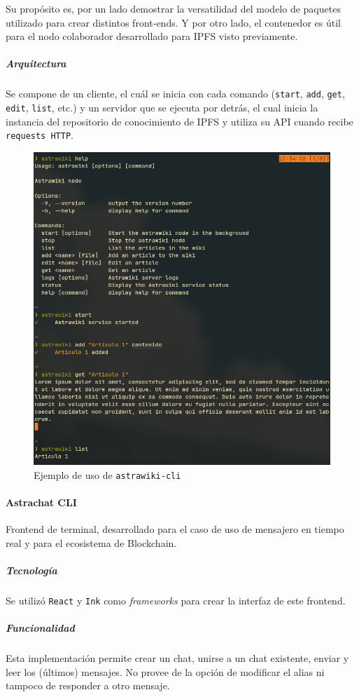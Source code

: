 Su propósito es, por un lado demostrar la versatilidad del modelo de paquetes utilizado para crear distintos front-ends. Y por otro lado, el contenedor es útil para el nodo colaborador desarrollado para IPFS visto previamente.

\subparagraph{Arquitectura} Se compone de un cliente, el cuál se inicia con cada comando (\texttt{start}, \texttt{add}, \texttt{get}, \texttt{edit}, \texttt{list}, etc.) y un servidor que se ejecuta por detrás, el cual inicia la instancia del repositorio de conocimiento de IPFS y utiliza su API cuando recibe \texttt{requests HTTP}.

\begin{figure}[H]
    \centering
    \includegraphics[width=0.7\linewidth]{img/astrawiki-cli.png}
    \caption{Ejemplo de uso de \texttt{astrawiki-cli}}
    \label{fig:astrawiki-cli}
\end{figure}

\paragraph{Astrachat CLI}

Frontend de terminal, desarrollado para el caso de uso de mensajero en tiempo real y para el ecosistema de Blockchain.

\subparagraph{Tecnología}

Se utilizó \texttt{React} \cite{react} y \texttt{Ink} \cite{ink} como \textit{frameworks} para crear la interfaz de este frontend.

\subparagraph{Funcionalidad}

Esta implementación permite crear un chat, unirse a un chat existente, enviar y leer los (últimos) mensajes. No provee de la opción de modificar el alias ni tampoco de responder a otro mensaje.

